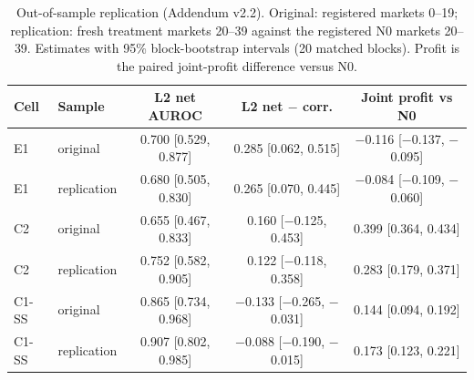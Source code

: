 \begin{table}[tb]
\centering\small
\setlength{\tabcolsep}{3pt}
\caption{Out-of-sample replication (Addendum v2.2). Original: registered markets 0--19; replication: fresh treatment markets 20--39 against the registered N0 markets 20--39. Estimates with 95\% block-bootstrap intervals (20 matched blocks). Profit is the paired joint-profit difference versus N0.}
\label{tab:replication}
\begin{tabular}{llccc}
\toprule
Cell & Sample & L2 net AUROC & L2 net $-$ corr. & Joint profit vs N0\\
\midrule
E1 & original & 0.700 [0.529, 0.877] & 0.285 [0.062, 0.515] & $-$0.116 [$-$0.137, $-$0.095]\\
E1 & replication & 0.680 [0.505, 0.830] & 0.265 [0.070, 0.445] & $-$0.084 [$-$0.109, $-$0.060]\\
C2 & original & 0.655 [0.467, 0.833] & 0.160 [$-$0.125, 0.453] & 0.399 [0.364, 0.434]\\
C2 & replication & 0.752 [0.582, 0.905] & 0.122 [$-$0.118, 0.358] & 0.283 [0.179, 0.371]\\
C1-SS & original & 0.865 [0.734, 0.968] & $-$0.133 [$-$0.265, $-$0.031] & 0.144 [0.094, 0.192]\\
C1-SS & replication & 0.907 [0.802, 0.985] & $-$0.088 [$-$0.190, $-$0.015] & 0.173 [0.123, 0.221]\\
\bottomrule
\end{tabular}
\end{table}
